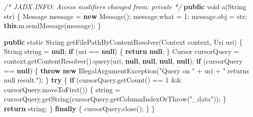 \documentclass[
]{article}
\newenvironment{Shaded}{}{}
\newcommand{\BuiltInTok}[1]{\textcolor[rgb]{0.00,0.50,0.00}{#1}}
\newcommand{\CommentTok}[1]{\textcolor[rgb]{0.38,0.63,0.69}{\textit{#1}}}
\newcommand{\ControlFlowTok}[1]{\textcolor[rgb]{0.00,0.44,0.13}{\textbf{#1}}}
\newcommand{\DataTypeTok}[1]{\textcolor[rgb]{0.56,0.13,0.00}{#1}}
\newcommand{\DecValTok}[1]{\textcolor[rgb]{0.25,0.63,0.44}{#1}}
\newcommand{\FunctionTok}[1]{\textcolor[rgb]{0.02,0.16,0.49}{#1}}
\newcommand{\KeywordTok}[1]{\textcolor[rgb]{0.00,0.44,0.13}{\textbf{#1}}}
\newcommand{\NormalTok}[1]{#1}
\newcommand{\OperatorTok}[1]{\textcolor[rgb]{0.40,0.40,0.40}{#1}}
\newcommand{\StringTok}[1]{\textcolor[rgb]{0.25,0.44,0.63}{#1}}
\begin{document}
\begin{Shaded}
\begin{Highlighting}[]
    \CommentTok{/* JADX INFO: Access modifiers changed from: private */}
    \KeywordTok{public} \DataTypeTok{void} \FunctionTok{a}\OperatorTok{(}\BuiltInTok{String}\NormalTok{ str}\OperatorTok{)} \OperatorTok{\{}
\NormalTok{        Message message }\OperatorTok{=} \KeywordTok{new} \FunctionTok{Message}\OperatorTok{();}
\NormalTok{        message}\OperatorTok{.}\FunctionTok{what} \OperatorTok{=} \DecValTok{1}\OperatorTok{;}
\NormalTok{        message}\OperatorTok{.}\FunctionTok{obj} \OperatorTok{=}\NormalTok{ str}\OperatorTok{;}
        \KeywordTok{this}\OperatorTok{.}\FunctionTok{m}\OperatorTok{.}\FunctionTok{sendMessage}\OperatorTok{(}\NormalTok{message}\OperatorTok{);}
    \OperatorTok{\}}

    \KeywordTok{public} \DataTypeTok{static} \BuiltInTok{String} \FunctionTok{getFilePathByContentResolver}\OperatorTok{(}\BuiltInTok{Context}\NormalTok{ context}\OperatorTok{,}\NormalTok{ Uri uri}\OperatorTok{)} \OperatorTok{\{}
        \BuiltInTok{String}\NormalTok{ string }\OperatorTok{=} \KeywordTok{null}\OperatorTok{;}
        \ControlFlowTok{if} \OperatorTok{(}\NormalTok{uri }\OperatorTok{==} \KeywordTok{null}\OperatorTok{)} \OperatorTok{\{}
            \ControlFlowTok{return} \KeywordTok{null}\OperatorTok{;}
        \OperatorTok{\}}
        \BuiltInTok{Cursor}\NormalTok{ cursorQuery }\OperatorTok{=}\NormalTok{ context}\OperatorTok{.}\FunctionTok{getContentResolver}\OperatorTok{().}\FunctionTok{query}\OperatorTok{(}\NormalTok{uri}\OperatorTok{,} \KeywordTok{null}\OperatorTok{,} \KeywordTok{null}\OperatorTok{,} \KeywordTok{null}\OperatorTok{,} \KeywordTok{null}\OperatorTok{);}
        \ControlFlowTok{if} \OperatorTok{(}\NormalTok{cursorQuery }\OperatorTok{==} \KeywordTok{null}\OperatorTok{)} \OperatorTok{\{}
            \ControlFlowTok{throw} \KeywordTok{new} \BuiltInTok{IllegalArgumentException}\OperatorTok{(}\StringTok{"Query on "} \OperatorTok{+}\NormalTok{ uri }\OperatorTok{+} \StringTok{" returns null result."}\OperatorTok{);}
        \OperatorTok{\}}
        \ControlFlowTok{try} \OperatorTok{\{}
            \ControlFlowTok{if} \OperatorTok{(}\NormalTok{cursorQuery}\OperatorTok{.}\FunctionTok{getCount}\OperatorTok{()} \OperatorTok{==} \DecValTok{1} \OperatorTok{\&\&}\NormalTok{ cursorQuery}\OperatorTok{.}\FunctionTok{moveToFirst}\OperatorTok{())} \OperatorTok{\{}
\NormalTok{                string }\OperatorTok{=}\NormalTok{ cursorQuery}\OperatorTok{.}\FunctionTok{getString}\OperatorTok{(}\NormalTok{cursorQuery}\OperatorTok{.}\FunctionTok{getColumnIndexOrThrow}\OperatorTok{(}\StringTok{"\_data"}\OperatorTok{));}
            \OperatorTok{\}}
            \ControlFlowTok{return}\NormalTok{ string}\OperatorTok{;}
        \OperatorTok{\}} \ControlFlowTok{finally} \OperatorTok{\{}
\NormalTok{            cursorQuery}\OperatorTok{.}\FunctionTok{close}\OperatorTok{();}
        \OperatorTok{\}}
    \OperatorTok{\}}


\end{Highlighting}
\end{Shaded}
\end{document}

